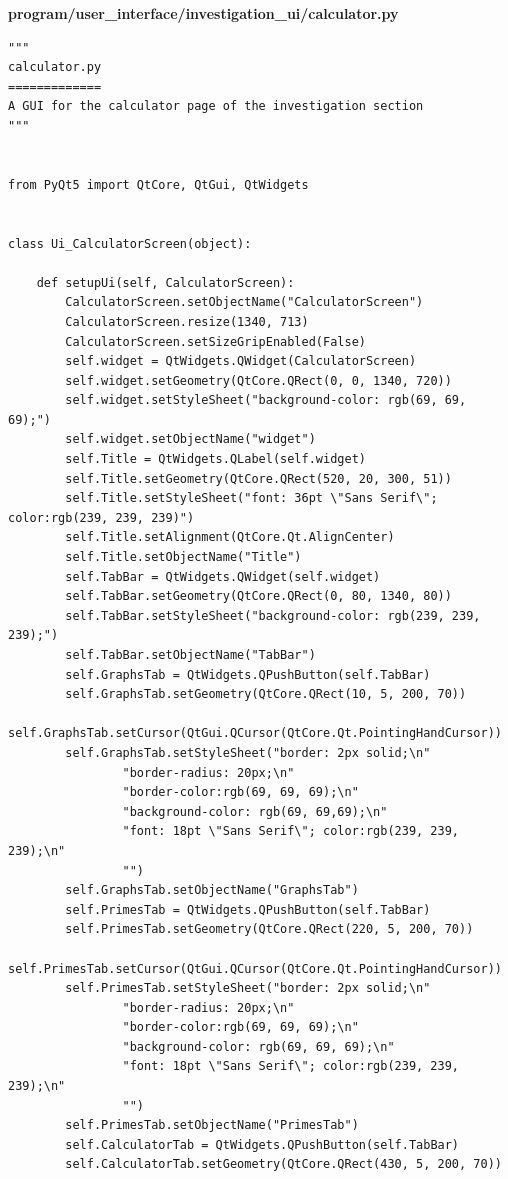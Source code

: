 \documentclass[12pt]{article}
\begin{document}
\textbf{program/user\_interface/investigation\_ui/calculator.py}
\begin{lstlisting}
"""
calculator.py
=============
A GUI for the calculator page of the investigation section
"""


from PyQt5 import QtCore, QtGui, QtWidgets


class Ui_CalculatorScreen(object):

    def setupUi(self, CalculatorScreen):
        CalculatorScreen.setObjectName("CalculatorScreen")
        CalculatorScreen.resize(1340, 713)
        CalculatorScreen.setSizeGripEnabled(False)
        self.widget = QtWidgets.QWidget(CalculatorScreen)
        self.widget.setGeometry(QtCore.QRect(0, 0, 1340, 720))
        self.widget.setStyleSheet("background-color: rgb(69, 69, 69);")
        self.widget.setObjectName("widget")
        self.Title = QtWidgets.QLabel(self.widget)
        self.Title.setGeometry(QtCore.QRect(520, 20, 300, 51))
        self.Title.setStyleSheet("font: 36pt \"Sans Serif\"; color:rgb(239, 239, 239)")
        self.Title.setAlignment(QtCore.Qt.AlignCenter)
        self.Title.setObjectName("Title")
        self.TabBar = QtWidgets.QWidget(self.widget)
        self.TabBar.setGeometry(QtCore.QRect(0, 80, 1340, 80))
        self.TabBar.setStyleSheet("background-color: rgb(239, 239, 239);")
        self.TabBar.setObjectName("TabBar")
        self.GraphsTab = QtWidgets.QPushButton(self.TabBar)
        self.GraphsTab.setGeometry(QtCore.QRect(10, 5, 200, 70))
        self.GraphsTab.setCursor(QtGui.QCursor(QtCore.Qt.PointingHandCursor))
        self.GraphsTab.setStyleSheet("border: 2px solid;\n"
                "border-radius: 20px;\n"
                "border-color:rgb(69, 69, 69);\n"
                "background-color: rgb(69, 69,69);\n"
                "font: 18pt \"Sans Serif\"; color:rgb(239, 239, 239);\n"
                "")
        self.GraphsTab.setObjectName("GraphsTab")
        self.PrimesTab = QtWidgets.QPushButton(self.TabBar)
        self.PrimesTab.setGeometry(QtCore.QRect(220, 5, 200, 70))
        self.PrimesTab.setCursor(QtGui.QCursor(QtCore.Qt.PointingHandCursor))
        self.PrimesTab.setStyleSheet("border: 2px solid;\n"
                "border-radius: 20px;\n"
                "border-color:rgb(69, 69, 69);\n"
                "background-color: rgb(69, 69, 69);\n"
                "font: 18pt \"Sans Serif\"; color:rgb(239, 239, 239);\n"
                "")
        self.PrimesTab.setObjectName("PrimesTab")
        self.CalculatorTab = QtWidgets.QPushButton(self.TabBar)
        self.CalculatorTab.setGeometry(QtCore.QRect(430, 5, 200, 70))

\end{lstlisting}
\end{document}
